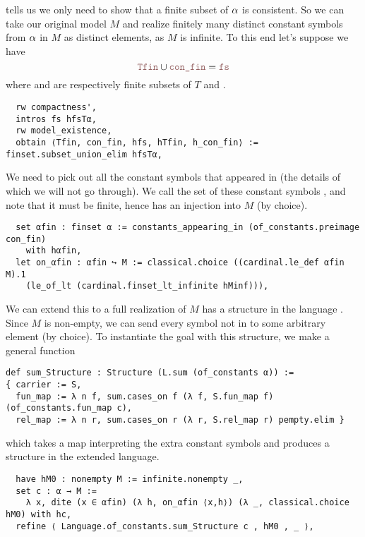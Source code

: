  tells us we only
need to show that a finite subset of $\alpha$ is consistent.
So we can take our original model $M$ and realize finitely many
distinct constant symbols from $\alpha$ in $M$ as distinct elements,
as $M$ is infinite.
To this end let's suppose we have
\[\code{Tfin} \cup \code{con\_fin} = \code{fs}\]
where  and  are respectively
finite subsets of $T$ and .

\begin{lstlisting}
  rw compactness',
  intros fs hfsTα,
  rw model_existence,
  obtain ⟨Tfin, con_fin, hfs, hTfin, h_con_fin⟩ := finset.subset_union_elim hfsTα, \end{lstlisting}

We need to pick out all the constant symbols that appeared in
 (the details of which we will not go through).
We call the set of these constant symbols ,
and note that it must be finite,
hence has an injection into $M$ (by choice).

\begin{lstlisting}
  set αfin : finset α := constants_appearing_in (of_constants.preimage con_fin)
    with hαfin,
  let on_αfin : αfin ↪ M := classical.choice ((cardinal.le_def αfin M).1
    (le_of_lt (cardinal.finset_lt_infinite hMinf))),
\end{lstlisting}

We can extend this to a full realization of $M$ has a structure in the
language .
Since $M$ is non-empty, we can send every symbol not in 
to some arbitrary element (by choice).
To instantiate the goal with this structure, we make a general function

\begin{lstlisting}
def sum_Structure : Structure (L.sum (of_constants α)) :=
{ carrier := S,
  fun_map := λ n f, sum.cases_on f (λ f, S.fun_map f) (of_constants.fun_map c),
  rel_map := λ n r, sum.cases_on r (λ r, S.rel_map r) pempty.elim } \end{lstlisting}

which takes a map interpreting the extra constant symbols
and produces a structure in the extended language.

\begin{lstlisting}
  have hM0 : nonempty M := infinite.nonempty _,
  set c : α → M :=
    λ x, dite (x ∈ αfin) (λ h, on_αfin ⟨x,h⟩) (λ _, classical.choice hM0) with hc,
  refine ⟨ Language.of_constants.sum_Structure c , hM0 , _ ⟩, \end{lstlisting}

